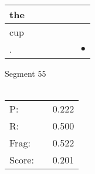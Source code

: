 \documentclass[landscape]{article}
\newcommand{\ssp}{\hspace{2pt}}
\newcommand{\mex}{\cellcolor{g}$\bullet$}
\begin{document}
\begin{tabular}{|l|p{10pt}|p{10pt}|p{10pt}|p{10pt}|p{10pt}|p{10pt}|}
\hline
\ssp the \ssp&\hspace{2pt}&\hspace{2pt}&\hspace{2pt}&\hspace{2pt}&\hspace{2pt}&\hspace{2pt}\\
\hline
\ssp cup \ssp&\hspace{2pt}&\hspace{2pt}&\hspace{2pt}&\hspace{2pt}&\hspace{2pt}&\hspace{2pt}\\
\hline
\ssp \cellcolor{ref5}. \ssp&\hspace{2pt}&\hspace{2pt}&\hspace{2pt}&\hspace{2pt}&\hspace{2pt}&\hspace{2pt}\mex\\
\hline
\end{tabular}

\vspace{6pt}
\noindent Segment 55\\\\
\noindent\begin{tabular}{lm{12pt}r}
\hline
P:&&0.222\\
R:&&0.500\\
Frag:&&0.522\\
Score:&&0.201\\
\end{tabular}

\newpage
\end{document}
